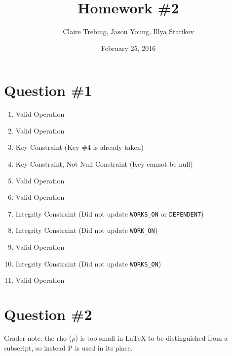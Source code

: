 \documentclass{article}
\title{Homework \#2}
\author{Claire Trebing, Jason Young, Illya Starikov}
\date{February 25, 2016}
\newcommand{\Rho}{\mathrm{P}}
\begin{document}
\maketitle

\section*{Question \#1}
\begin{enumerate}[label=\alph*.]
    \item Valid Operation
    \item Valid Operation
    \item Key Constraint (Key \#4 is already taken)
    \item Key Constraint, Not Null Constraint (Key cannot be null)
    \item Valid Operation
    \item Valid Operation
    \item Integrity Constraint (Did not update \texttt{WORKS\_ON} or \texttt{DEPENDENT})
    \item Integrity Constraint (Did not update
    \texttt{WORK\_ON})
    \item Valid Operation
    \item Integrity Constraint (Did not update \texttt{WORKS\_ON})
    \item Valid Operation
\end{enumerate}

\section*{Question \#2}
Grader note: the rho ($\rho$) is too small in \LaTeX{} to be distinguished from a subscript, so instead $\Rho$ is used in its place.
\end{document}
